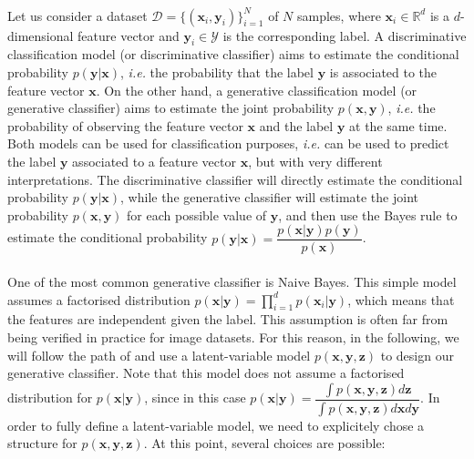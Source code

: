 \documentclass[11pt,twocolumn,letterpaper]{article}
\begin{document}
\paragraph{} Let us consider a dataset $\mathcal{D} = \{(\bm{x}_i, \bm{y}_i)\}_{i=1}^N$ of $N$ samples, where $\bm{x}_i \in \mathbb{R}^d$ is a $d$-dimensional feature vector and $\bm{y}_i \in \mathcal{Y}$ is the corresponding label. A discriminative classification model (or discriminative classifier) aims to estimate the conditional probability $p(\bm{y}|\bm{x})$, \textit{i.e.} the probability that the label $\bm{y}$ is associated to the feature vector $\bm{x}$. On the other hand, a generative classification model (or generative classifier) aims to estimate the joint probability $p(\bm{x}, \bm{y})$, \textit{i.e.} the probability of observing the feature vector $\bm{x}$ and the label $\bm{y}$ at the same time. Both models can be used for classification purposes, \textit{i.e.} can be used to predict the label $\bm{y}$ associated to a feature vector $\bm{x}$, but with very different interpretations. The discriminative classifier will directly estimate the conditional probability $p(\bm{y}|\bm{x})$, while the generative classifier will estimate the joint probability $p(\bm{x}, \bm{y})$ for each possible value of $\bm{y}$, and then use the Bayes rule to estimate the conditional probability $p(\bm{y}|\bm{x}) = \dfrac{p(\bm{x}|\bm{y})p(\bm{y})}{p(\bm{x})}$.

\paragraph{} One of the most common generative classifier is Naive Bayes. This simple model assumes a factorised distribution $\displaystyle p(\bm{x}|\bm{y}) = \prod_{i=1}^d p(\bm{x}_i|\bm{y})$, which means that the features are independent given the label. This assumption is often far from being verified in practice for image datasets. For this reason, in the following, we will follow the path of \cite{main_paper} and use a latent-variable model $p(\bm{x}, \bm{y}, \bm{z})$ to design our generative classifier. Note that this model does not assume a factorised distribution for $p(\bm{x}|\bm{y})$, since in this case $p(\bm{x}|\bm{y}) = \displaystyle\dfrac{\int p(\bm{x}, \bm{y}, \bm{z}) d\bm{z}}{\int p(\bm{x}, \bm{y}, \bm{z}) d\bm{x} d\bm{y}}$. In order to fully define a latent-variable model, we need to explicitely chose a structure for $p(\bm{x}, \bm{y}, \bm{z})$. At this point, several choices are possible:
\end{document}
